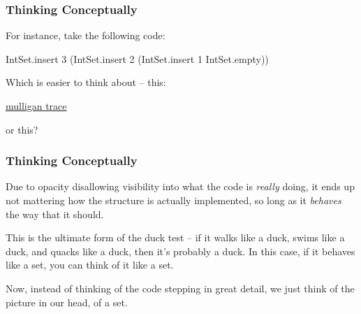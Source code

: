 \documentclass[aspectratio=169]{beamer}
\begin{document}
\begin{frame}[fragile]
  \frametitle{Thinking Conceptually}

  For instance, take the following code:

  \pause
  \vspace{\fill}

  {\small
  \begin{codeblock}
    IntSet.insert 3 (IntSet.insert 2 (IntSet.insert 1 IntSet.empty))
  \end{codeblock}
  }

  \pause
  \vspace{\fill}

  Which is easier to think about -- this:

  \begin{center}
    {\color{blue} \href{https://asciinema.org/a/x3HwtfZyK6TYkDQ9eA1NztuVR}{mulligan trace}
    }
  \end{center}

  \pause
  or this?

  \begin{center}
  \end{center}
\end{frame}

\begin{frame}[fragile]
  \frametitle{Thinking Conceptually}

  Due to opacity disallowing visibility into what the code is \textit{really}
  doing, it ends up not mattering how the structure is actually implemented,
  so long as it \textit{behaves} the way that it should.

  \pause
  \vspace{\fill}

  This is the ultimate form of the duck test -- if it walks like a duck,
  swims like a duck, and quacks like a duck, then it's probably a duck. In this
  case, if it behaves like a set, you can think of it like a set.

  \pause
  \vspace{\fill}

  Now, instead of thinking of the code stepping in great detail, we just
  think of the picture in our head, of a set.
\end{frame}
\end{document}
